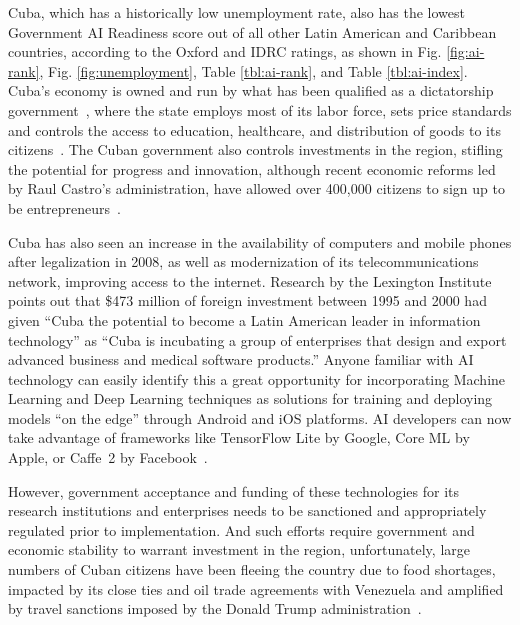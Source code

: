 \documentclass[conference]{IEEEtran}
\begin{document}
Cuba, which has a historically low unemployment rate, also has the lowest Government AI Readiness score out of all other Latin American and Caribbean countries, according to the Oxford and IDRC ratings, as shown in Fig. \ref{fig:ai-rank}, Fig. \ref{fig:unemployment}, Table \ref{tbl:ai-rank}, and Table \ref{tbl:ai-index}. Cuba's economy is owned and run by what has been qualified as a dictatorship government~\cite{horowitz2004transition}, where the state employs most of its labor force, sets price standards and controls the access to education, healthcare, and distribution of goods to its citizens~\cite{smith2016understanding}. The Cuban government also controls investments in the region, stifling the potential for progress and innovation, although recent economic reforms led by Raul Castro's administration, have allowed over 400,000 citizens to sign up to be entrepreneurs~\cite{feinberg2012new}.

Cuba has also seen an increase in the availability of computers and mobile phones after legalization in 2008, as well as modernization of its telecommunications network, improving access to the internet. Research by the Lexington Institute~\cite{peters2001cuba} points out that \$473 million of foreign investment between 1995 and 2000 had given ``Cuba the potential to become a Latin American leader in information technology'' as ``Cuba is incubating a group of enterprises that design and export advanced business and medical software products.'' Anyone familiar with AI technology can easily identify this a great opportunity for incorporating Machine Learning and Deep Learning techniques as solutions for training and deploying models ``on the edge'' through Android and iOS platforms. AI developers can now take advantage of frameworks like TensorFlow Lite
by Google, Core ML
by Apple, or Caffe~2
by Facebook~\cite{jia2016delivering}.

However, government acceptance and funding of these technologies for its research institutions and enterprises needs to be sanctioned and appropriately regulated prior to implementation. And such efforts require government and economic stability to warrant investment in the region, unfortunately, large numbers of Cuban citizens have been fleeing the country due to food shortages, impacted by its close ties and oil trade agreements with Venezuela and amplified by travel sanctions imposed by the Donald Trump administration~\cite{cordoba2019cuba}.
\end{document}
